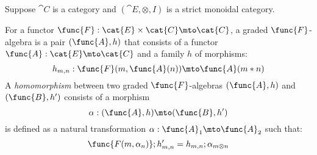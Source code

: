 Suppose $\cat{C}$ is a category and $(\cat{E},\otimes,I)$ is a strict
monoidal category.

\begin{definition}
    For a functor $\func{F} : \cat{E} \times \cat{C} \mto \cat{C}$, a
    graded $\func{F}$-algebra is a pair $(\func{A},h)$ that consists
    of a functor $\func{A} : \cat{E} \mto \cat{C}$ and a family $h$ of
    morphisms:
    \[ 
        h_{m,n} : \func{F}(m,\func{A}(n)) \mto \func{A}(m * n)
    \]
    A \emph{homomorphism} between two graded $\func{F}$-algebras
    $(\func{A},h)$ and $(\func{B},h')$ consists of a morphism
    \[
        \alpha : (\func{A},h) \mto (\func{B},h')
    \]
    is defined as a natural transformation $\alpha : \func{A}_1 \mto
    \func{A}_2$ such that:
    \[
        \func{F(m,\alpha_n)} ; h'_{m,n} = h_{m,n} ; \alpha_{m \otimes n}
    \]
\end{definition}

